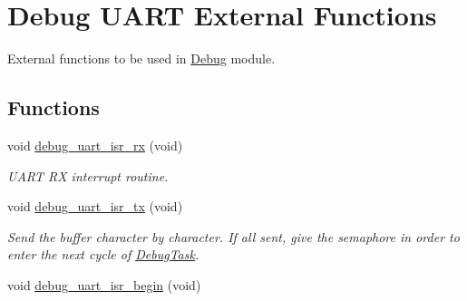 \hypertarget{group___debug___u_a_r_t___external___functions}{}\section{Debug U\+A\+RT External Functions}
\label{group___debug___u_a_r_t___external___functions}


External functions to be used in \hyperlink{group___debug}{Debug} module.  


\subsection*{Functions}
\begin{DoxyCompactItemize}
\item 
void \hyperlink{group___debug___u_a_r_t___external___functions_ga2e1878be0250daf30f0a286af6e683e9}{debug\+\_\+uart\+\_\+isr\+\_\+rx} (void)\hypertarget{group___debug___u_a_r_t___external___functions_ga2e1878be0250daf30f0a286af6e683e9}{}\label{group___debug___u_a_r_t___external___functions_ga2e1878be0250daf30f0a286af6e683e9}

\begin{DoxyCompactList}\small\item\em U\+A\+RT RX interrupt routine. \end{DoxyCompactList}\item 
void \hyperlink{group___debug___u_a_r_t___external___functions_gaee765dd75f3414ade869071798ff33f4}{debug\+\_\+uart\+\_\+isr\+\_\+tx} (void)\hypertarget{group___debug___u_a_r_t___external___functions_gaee765dd75f3414ade869071798ff33f4}{}\label{group___debug___u_a_r_t___external___functions_gaee765dd75f3414ade869071798ff33f4}

\begin{DoxyCompactList}\small\item\em Send the buffer character by character. If all sent, give the semaphore in order to enter the next cycle of \hyperlink{group___debug___exported___functions___group2_ga0e7fca846e34e06a1f62249fe8a30a44}{Debug\+Task}. \end{DoxyCompactList}\item 
void \hyperlink{group___debug___u_a_r_t___external___functions_ga9d19c0e57b2d37c01bd781338322f682}{debug\+\_\+uart\+\_\+isr\+\_\+begin} (void)\hypertarget{group___debug___u_a_r_t___external___functions_ga9d19c0e57b2d37c01bd781338322f682}{}\label{group___debug___u_a_r_t___external___functions_ga9d19c0e57b2d37c01bd781338322f682}


\end{DoxyCompactItemize}
